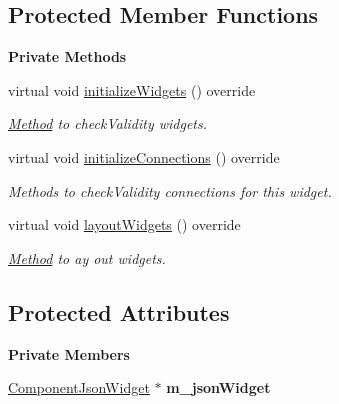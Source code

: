 \subsection*{Protected Member Functions}
\begin{Indent}\textbf{ Private Methods}\par
\begin{DoxyCompactItemize}
\item 
\mbox{\label{classrev_1_1_view_1_1_generic_component_widget_a0e050e6babb71e9fcdb9c43685ad3cad}} 
virtual void \mbox{\hyperlink{classrev_1_1_view_1_1_generic_component_widget_a0e050e6babb71e9fcdb9c43685ad3cad}{initialize\+Widgets}} () override
\begin{DoxyCompactList}\small\item\em \mbox{\hyperlink{struct_method}{Method}} to check\+Validity widgets. \end{DoxyCompactList}\item 
\mbox{\label{classrev_1_1_view_1_1_generic_component_widget_ac4e652e7c68f35357851048f9d803b8a}} 
virtual void \mbox{\hyperlink{classrev_1_1_view_1_1_generic_component_widget_ac4e652e7c68f35357851048f9d803b8a}{initialize\+Connections}} () override
\begin{DoxyCompactList}\small\item\em Methods to check\+Validity connections for this widget. \end{DoxyCompactList}\item 
\mbox{\label{classrev_1_1_view_1_1_generic_component_widget_a2f6613f76411387b21ffc1458e89a423}} 
virtual void \mbox{\hyperlink{classrev_1_1_view_1_1_generic_component_widget_a2f6613f76411387b21ffc1458e89a423}{layout\+Widgets}} () override
\begin{DoxyCompactList}\small\item\em \mbox{\hyperlink{struct_method}{Method}} to ay out widgets. \end{DoxyCompactList}\end{DoxyCompactItemize}
\end{Indent}
\subsection*{Protected Attributes}
\begin{Indent}\textbf{ Private Members}\par
\begin{DoxyCompactItemize}
\item 
\mbox{\label{classrev_1_1_view_1_1_generic_component_widget_a0a2ecb2e88c56813aa99a8d1d1a7673c}} 
\mbox{\hyperlink{classrev_1_1_view_1_1_component_json_widget}{Component\+Json\+Widget}} $\ast$ {\bfseries m\+\_\+json\+Widget}
\end{DoxyCompactItemize}
\end{Indent}
